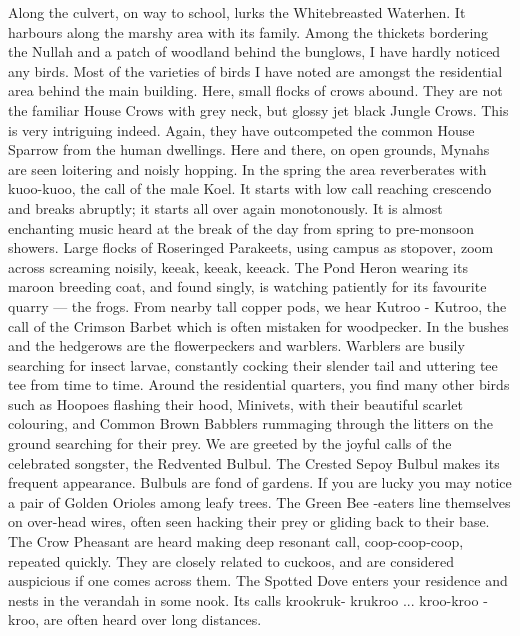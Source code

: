 Along the culvert, on way to school, lurks the Whitebreasted 
Waterhen. It harbours along the marshy area with its family. Among the 
thickets bordering the Nullah and a patch of woodland behind the bunglows, 
I have hardly noticed any birds. Most of the varieties of birds I have noted 
are amongst the residential area behind the main building. Here, small 
flocks of crows abound. They are not the familiar House Crows with grey 
neck, but glossy jet black Jungle Crows. This is very intriguing indeed. 
Again, they have outcompeted the common House Sparrow from the human 
dwellings. Here and there, on open grounds, Mynahs are seen loitering and 
noisly hopping. In the spring the area reverberates with kuoo-kuoo, the call 
of the male Koel. It starts with low call reaching crescendo and breaks 
abruptly; it starts all over again monotonously. It is almost enchanting music 
heard at the break of the day from spring to pre-monsoon showers. Large 
flocks of Roseringed Parakeets, using campus as stopover, zoom across 
screaming noisily, keeak, keeak, keeack. The Pond Heron wearing its 
maroon breeding coat, and found singly, is watching patiently for its 
favourite quarry --- the frogs. From nearby tall copper pods, we hear Kutroo - Kutroo, the call of the Crimson Barbet which is often mistaken for 
woodpecker. In the bushes and the hedgerows are the flowerpeckers and 
warblers. Warblers are busily searching for insect larvae, constantly cocking 
their slender tail and uttering tee tee from time to time. Around the 
residential quarters, you find many other birds such as Hoopoes flashing 
their hood, Minivets, with their beautiful scarlet colouring, and Common 
Brown Babblers rummaging through the litters on the ground searching for 
their prey. We are greeted by the joyful calls of the celebrated songster, the 
Redvented Bulbul. The Crested Sepoy Bulbul makes its frequent 
appearance. Bulbuls are fond of gardens. If you are lucky you may notice a 
pair of Golden Orioles among leafy trees. The Green Bee -eaters line 
themselves on over-head wires, often seen hacking their prey or gliding back 
to their base. The Crow Pheasant are heard making deep resonant call, 
coop-coop-coop, repeated quickly. They are closely related to cuckoos, and 
are considered auspicious if one comes across them. The Spotted Dove 
enters your residence and nests in the verandah in some nook. Its calls krookruk-
krukroo ... kroo-kroo - kroo, are often heard over long distances. 

